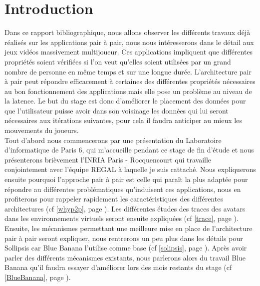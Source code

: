 \section{Introduction}
	Dans ce rapport bibliographique, nous allons observer les différents travaux déjà réalisés sur les applications pair à pair, nous nous intéresserons dans le détail aux jeux vidéos massivement multijoueur. Ces applications impliquent que différentes propriétés soient vérifiées si l'on veut qu'elles soient utilisées par un grand nombre de personne en même temps et sur une longue durée. L'architecture pair à pair peut répondre efficacement à certaines des différentes propriétés nécessaires au bon fonctionnement des applications mais elle pose un problème au niveau de la latence. Le but du stage est donc d'améliorer le placement des données pour que l'utilisateur puisse avoir dans son voisinage les données qui lui seront nécessaires aux itérations suivantes, pour cela il faudra anticiper au mieux les mouvements du joueurs.\\

	Tout d'abord nous commencerons par une présentation du Laboratoire d'informatique de Paris 6, qui m'accueille pendant ce stage de fin d'étude et nous présenterons brièvement l'INRIA Paris - Rocquencourt qui travaille conjointement avec l'équipe REGAL à laquelle je suis rattaché. Nous expliquerons ensuite pourquoi l'approche pair à pair est celle qui paraît la plus adaptée pour répondre au différentes problématiques qu'induisent ces applications, nous en profiterons pour rappeler rapidement les caractéristiques des différentes architectures (cf \ref{whyp2p}, page \pageref{whyp2p}). Les différentes études des traces des avatars dans les environnements virtuels seront ensuite expliquées (cf \ref{trace}, page \pageref{trace}). Ensuite, les mécanismes permettant une meilleure mise en place de l'architecture pair à pair seront expliquer, nous rentrerons un peu plus dans les détails pour Sollipsis car Blue Banana l'utilise comme base (cf \ref{solipsis}, page \pageref{solipsis}). Après avoir parler des différents mécanismes existants, nous parlerons alors du travail Blue Banana qu'il faudra essayer d'améliorer lors des mois restants du stage (cf \ref{BlueBanana}, page \pageref{BlueBanana}).

